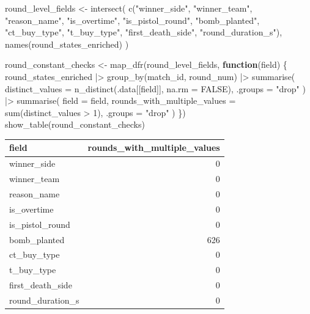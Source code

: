 \documentclass[
  letterpaper,
  DIV=11,
  numbers=noendperiod]{scrartcl}
\newenvironment{Shaded}{\begin{snugshade}}{\end{snugshade}}
\newcommand{\AttributeTok}[1]{\textcolor[rgb]{0.40,0.45,0.13}{#1}}
\newcommand{\ConstantTok}[1]{\textcolor[rgb]{0.56,0.35,0.01}{#1}}
\newcommand{\ControlFlowTok}[1]{\textcolor[rgb]{0.00,0.23,0.31}{\textbf{#1}}}
\newcommand{\DecValTok}[1]{\textcolor[rgb]{0.68,0.00,0.00}{#1}}
\newcommand{\FunctionTok}[1]{\textcolor[rgb]{0.28,0.35,0.67}{#1}}
\newcommand{\NormalTok}[1]{\textcolor[rgb]{0.00,0.23,0.31}{#1}}
\newcommand{\OtherTok}[1]{\textcolor[rgb]{0.00,0.23,0.31}{#1}}
\newcommand{\SpecialCharTok}[1]{\textcolor[rgb]{0.37,0.37,0.37}{#1}}
\newcommand{\StringTok}[1]{\textcolor[rgb]{0.13,0.47,0.30}{#1}}
\newcounter{none} %
\begin{document}
\begin{Shaded}
\begin{Highlighting}[]
\NormalTok{round\_level\_fields }\OtherTok{\textless{}{-}} \FunctionTok{intersect}\NormalTok{(}
  \FunctionTok{c}\NormalTok{(}\StringTok{"winner\_side"}\NormalTok{, }\StringTok{"winner\_team"}\NormalTok{, }\StringTok{"reason\_name"}\NormalTok{, }\StringTok{"is\_overtime"}\NormalTok{,}
    \StringTok{"is\_pistol\_round"}\NormalTok{, }\StringTok{"bomb\_planted"}\NormalTok{, }\StringTok{"ct\_buy\_type"}\NormalTok{, }\StringTok{"t\_buy\_type"}\NormalTok{,}
    \StringTok{"first\_death\_side"}\NormalTok{, }\StringTok{"round\_duration\_s"}\NormalTok{),}
  \FunctionTok{names}\NormalTok{(round\_states\_enriched)}
\NormalTok{)}

\NormalTok{round\_constant\_checks }\OtherTok{\textless{}{-}} \FunctionTok{map\_dfr}\NormalTok{(round\_level\_fields, }\ControlFlowTok{function}\NormalTok{(field) \{}
\NormalTok{  round\_states\_enriched }\SpecialCharTok{|\textgreater{}}
    \FunctionTok{group\_by}\NormalTok{(match\_id, round\_num) }\SpecialCharTok{|\textgreater{}}
    \FunctionTok{summarise}\NormalTok{(}
      \AttributeTok{distinct\_values =} \FunctionTok{n\_distinct}\NormalTok{(.data[[field]], }\AttributeTok{na.rm =} \ConstantTok{FALSE}\NormalTok{),}
      \AttributeTok{.groups =} \StringTok{"drop"}
\NormalTok{    ) }\SpecialCharTok{|\textgreater{}}
    \FunctionTok{summarise}\NormalTok{(}
      \AttributeTok{field =}\NormalTok{ field,}
      \AttributeTok{rounds\_with\_multiple\_values =} \FunctionTok{sum}\NormalTok{(distinct\_values }\SpecialCharTok{\textgreater{}} \DecValTok{1}\NormalTok{),}
      \AttributeTok{.groups =} \StringTok{"drop"}
\NormalTok{    )}
\NormalTok{\})}
\FunctionTok{show\_table}\NormalTok{(round\_constant\_checks)}
\end{Highlighting}
\end{Shaded}

{\def\LTcaptype{none} %
\begin{longtable}[]{@{}lr@{}}
\toprule\noalign{}
field & rounds\_with\_multiple\_values \\
\midrule\noalign{}
\endhead
\bottomrule\noalign{}
\endlastfoot
winner\_side & 0 \\
winner\_team & 0 \\
reason\_name & 0 \\
is\_overtime & 0 \\
is\_pistol\_round & 0 \\
bomb\_planted & 626 \\
ct\_buy\_type & 0 \\
t\_buy\_type & 0 \\
first\_death\_side & 0 \\
round\_duration\_s & 0 \\
\end{longtable}
}
\end{document}
